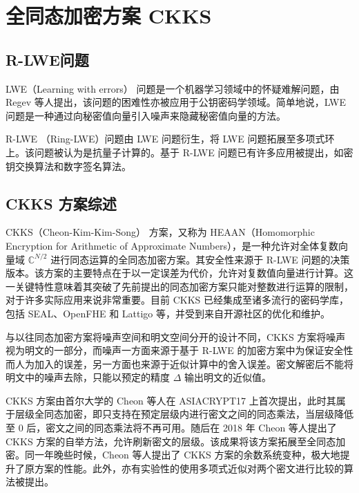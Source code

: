 \section{全同态加密方案 CKKS}

\subsection{R-LWE问题}

LWE（Learning with errors） 问题是一个机器学习领域中的怀疑难解问题，由 Regev 等人提出\cite{10.1145/1568318.1568324}，该问题的困难性亦被应用于公钥密码学领域。简单地说，LWE 问题是一种通过向秘密值向量引入噪声来隐藏秘密值向量的方法。


R-LWE （Ring-LWE）问题由 LWE 问题衍生，将 LWE 问题拓展至多项式环上。该问题被认为是抗量子计算的。基于 R-LWE 问题已有许多应用被提出，如密钥交换算法\cite{cryptoeprint:2012/688}和数字签名算法\cite{cryptoeprint:2011/537}。


\subsection{CKKS 方案综述} \label{sec:CKKS_Review}

CKKS（Cheon-Kim-Kim-Song） 方案，又称为 HEAAN（Homomorphic Encryption for Arithmetic of Approximate Numbers），是一种允许对全体复数向量域 $\mathbb{C}^{N/2}$ 进行同态运算的全同态加密方案。其安全性来源于 R-LWE 问题的决策版本。该方案的主要特点在于以一定误差为代价，允许对复数值向量进行计算。这一关键特性意味着其突破了先前提出的同态加密方案只能对整数进行运算的限制，对于许多实际应用来说非常重要。目前 CKKS 已经集成至诸多流行的密码学库，包括 SEAL、OpenFHE 和 Lattigo 等\cite{sealcrypto,OpenFHE,Mouchet2020LattigoAM}，并受到来自开源社区的优化和维护。

与以往同态加密方案将噪声空间和明文空间分开的设计不同，CKKS 方案将噪声视为明文的一部分，而噪声一方面来源于基于 R-LWE 的加密方案中为保证安全性而人为加入的误差，另一方面也来源于近似计算中的舍入误差。密文解密后不能将明文中的噪声去除，只能以预定的精度 $\Delta$ 输出明文的近似值。\cite{CKKS_optimize}

CKKS 方案由首尔大学的 Cheon 等人在 ASIACRYPT17 上首次提出\cite{cryptoeprint:2016/421}，此时其属于层级全同态加密，即只支持在预定层级内进行密文之间的同态乘法，当层级降低至 0 后，密文之间的同态乘法将不再可用。随后在 2018 年 Cheon 等人提出了 CKKS 方案的自举方法\cite{cryptoeprint:2018/153}，允许刷新密文的层级。该成果将该方案拓展至全同态加密。同一年晚些时候，Cheon 等人提出了 CKKS 方案的余数系统变种，极大地提升了原方案的性能。\cite{cryptoeprint:2018/931}此外，亦有实验性的使用多项式近似对两个密文进行比较的算法被提出\cite{cryptoeprint:2019/417,cryptoeprint:2019/1234,cryptoeprint:2020/834}。

